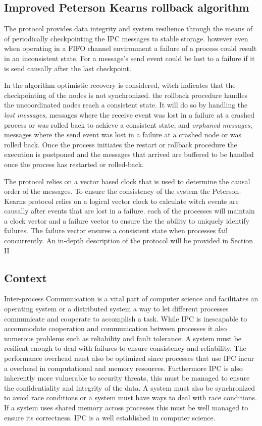 \documentclass[twocolumn, a4paper,11pt]{article}%
\begin{document}
\subsection{Improved Peterson Kearns rollback algorithm}
\par The protocol provides data integrity and system resilience through the means of  of periodically checkpointing the IPC messages to stable storage. however even when operating in a FIFO channel environment  a failure of a process could result in an inconsistent state. For a message's send event could be lost to a failure if it is send causally after the last checkpoint. 
\par In the algorithm optimistic recovery is  considered, witch indicates that the checkpointing of the nodes is not synchronized. the rollback procedure handles the uncoordinated nodes reach a consistent state. It will do so by handling the \textit{lost messages}, messages where the receive event was lost in a failure at a crashed process or was rolled back to achieve a consistent state, and \textit{orphaned messages}, messages where the send event was lost in a failure at a crashed node or was rolled back. Once the process initiates the  restart or rollback procedure the execution is postponed and the messages that arrived are buffered to be handled once the process has restarted or rolled-back. 
\par The protocol relies on a vector based clock that is used to determine the causal order of the messages. To ensure the consistency of the system the Peterson-Kearns protocol relies on a logical vector clock to calculate witch events are causally after events that are lost in a failure.  each of the processes will maintain a clock vector and a failure vector  to ensure the the ability to uniquely identify failures. The failure vector ensures a consistent state when processes fail concurrently. An in-depth description of the protocol will be provided in Section II

\subsection{Context}
Inter-process Communication is a vital part of computer science and facilitates an operating system\cite{stevens1999unix} or a distributed system\cite{geeksforgeeks2019ipc} a way to let different processes communicate and cooperate to accomplish a task.  While IPC is inescapable to accommodate cooperation and communication between processes it also numerous problems such as reliability and fault tolerance. A system must be resilient enough to deal with failures to ensure consistency and reliability. The performance overhead must also be optimized since processes that use IPC incur a overhead in computational and memory resources. Furthermore IPC is also inherently more vulnerable to security threats\cite{mitre2024ipc}, this must be managed to ensure the confidentiality and integrity of the data.  A system must also be synchronized  to avoid race conditions or a system must have ways to deal with race conditions. If a system uses shared memory across processes this must be well managed to ensure its correctness.
IPC is a well established in computer science. 
\end{document}
